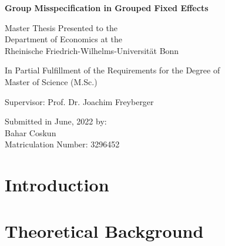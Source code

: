 \documentclass[paper=a4,oneside,DIV=8,fontsize=12pt, sectionentrydots=true]{scrartcl}
\theoremstyle{dotless}
\begin{document}
 \pagestyle{empty}

 \begin{titlepage}

 \vspace*{1cm} 

 \begin{center} 
 {\Large{\textbf{Group Misspecification in Grouped Fixed Effects}} \vspace{3cm}
 
 {\normalsize Master Thesis Presented to the \\
 Department of Economics at the\\
 Rheinische Friedrich-Wilhelms-Universität Bonn}\\\vspace{0.5cm}

 {\normalsize In Partial Fulfillment of the Requirements for the Degree of \\
Master of Science (M.Sc.)}\\\vspace{4.5cm}
 


 {\normalsize Supervisor: Prof. Dr. Joachim Freyberger} \\\vspace{2cm}


{\normalsize Submitted in June, 2022 by: \\
Bahar Coskun \\
Matriculation Number: 3296452}
} \end{center}
\end{titlepage}


\tableofcontents
{}

\clearpage
\listoffigures
\listoftables
{}
\newpage


\newpage
{} %
\setcounter{table}{0}
\pagestyle{mypagestyle}

\section{Introduction}\label{intro}


\section{Theoretical Background}

\end{document}

